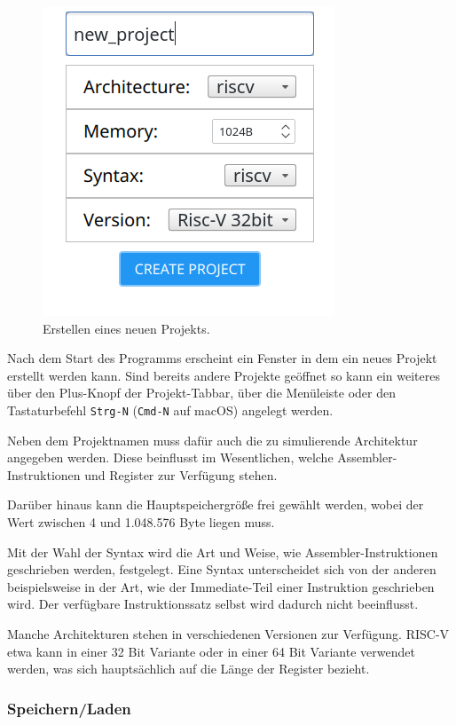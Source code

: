 \begin{figure}[ht]
	\centering
  \includegraphics[scale=1]{Images/create_new_project}
	\caption{Erstellen eines neuen Projekts.}
	\label{Project_Creation}
\end{figure}

Nach dem Start des Programms erscheint ein Fenster in dem ein neues Projekt
erstellt werden kann. Sind bereits andere Projekte geöffnet so kann ein weiteres
über den Plus-Knopf der Projekt-Tabbar, über die Menüleiste oder den
Tastaturbefehl \texttt{Strg-N} (\texttt{Cmd-N} auf macOS) angelegt werden.

Neben dem Projektnamen muss dafür auch die zu simulierende Architektur angegeben
werden. Diese beinflusst im Wesentlichen, welche
Assembler-Instruktionen und Register zur Verfügung stehen.

Darüber hinaus kann die Hauptspeichergröße frei gewählt werden, wobei der Wert
zwischen 4 und 1.048.576 Byte liegen muss.

Mit der Wahl der Syntax wird die Art und Weise, wie Assembler-Instruktionen
geschrieben werden, festgelegt. Eine Syntax unterscheidet sich von der anderen
beispielsweise in der Art, wie der Immediate-Teil einer Instruktion geschrieben
wird. Der verfügbare Instruktionssatz selbst wird dadurch nicht beeinflusst.

Manche Architekturen stehen in verschiedenen Versionen zur Verfügung. RISC-V
etwa kann in einer 32 Bit Variante oder in einer 64 Bit Variante verwendet
werden, was sich hauptsächlich auf die Länge der Register bezieht.


\subsubsection{Speichern/Laden}

